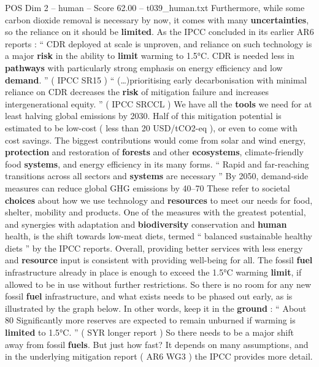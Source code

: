 \begin{textsample}{POS Dim 2 – human – Score 62.00 – t039\_human.txt}
Furthermore, while some carbon dioxide removal is necessary by now, it comes with many \textbf{uncertainties}, so the reliance on it should be \textbf{limited}.
As the IPCC concluded in its earlier AR6 reports : “ CDR deployed at scale is unproven, and reliance on such technology is a major \textbf{risk} in the ability to \textbf{limit} warming to 1.5°C.
CDR is needed less in \textbf{pathways} with particularly strong emphasis on energy efficiency and low \textbf{demand}. ” ( IPCC SR15 ) “ (…)prioritising early decarbonisation with minimal reliance on CDR decreases the \textbf{risk} of mitigation failure and increases intergenerational equity. ” ( IPCC SRCCL ) We have all the \textbf{tools} we need for at least halving global emissions by 2030.
Half of this mitigation potential is estimated to be low-cost ( less than 20 USD/tCO2-eq ), or even to come with cost savings.
The biggest contributions would come from solar and wind energy, \textbf{protection} and restoration of \textbf{forests} and other \textbf{ecosystems}, climate-friendly food \textbf{systems}, and energy efficiency in its many forms. “ Rapid and far-reaching transitions across all sectors and \textbf{systems} are necessary ” By 2050, demand-side measures can reduce global GHG emissions by 40–70 %
These refer to societal \textbf{choices} about how we use technology and \textbf{resources} to meet our needs for food, shelter, mobility and products.
One of the measures with the greatest potential, and synergies with adaptation and \textbf{biodiversity} conservation and \textbf{human} health, is the shift towards low-meat diets, termed “ balanced sustainable healthy diets ” by the IPCC reports.
Overall, providing better services with less energy and \textbf{resource} input is consistent with providing well-being for all.
The fossil \textbf{fuel} infrastructure already in place is enough to exceed the 1.5°C warming \textbf{limit}, if allowed to be in use without further restrictions.
So there is no room for any new fossil \textbf{fuel} infrastructure, and what exists needs to be phased out early, as is illustrated by the graph below.
In other words, keep it in the \textbf{ground} : “ About 80 %
Significantly more reserves are expected to remain unburned if warming is \textbf{limited} to 1.5°C. ” ( SYR longer report ) So there needs to be a major shift away from fossil \textbf{fuels}.
But just how fast?
It depends on many assumptions, and in the underlying mitigation report ( AR6 WG3 ) the IPCC provides more detail.

\end{textsample}
